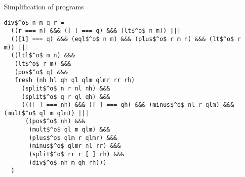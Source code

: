 \documentclass{beamer}
\let\\\tabularnewline
\let\\\tabularnewline
\theoremstyle{definition}
\theoremstyle{plain} %
\begin{document}
\begin{frame}[fragile]{Simplification of programs}



\newsavebox{\mybox}

\begin{lrbox}{\mybox}
    \begin{lstlisting}[basicstyle=\tiny]
div$^o$ n m q r =
  ((r === n) &&& ([ ] === q) &&& (lt$^o$ n m)) |||
  (([1] === q) &&& (eql$^o$ n m) &&& (plus$^o$ r m n) &&& (lt$^o$ r m)) |||
  ((ltl$^o$ m n) &&&
   (lt$^o$ r m) &&&
   (pos$^o$ q) &&&
   fresh (nh hl qh ql qlm qlmr rr rh)
     (split$^o$ n r nl nh) &&&
     (split$^o$ q r ql qh) &&&
     ((([ ] === nh) &&& ([ ] === qh) &&& (minus$^o$ nl r qlm) &&& (mult$^o$ ql m qlm)) |||
      ((pos$^o$ nh) &&&
       (mult$^o$ ql m qlm) &&&
       (plus$^o$ qlm r qlmr) &&&
       (minus$^o$ qlmr nl rr) &&&
       (split$^o$ rr r [ ] rh) &&&
       (div$^o$ nh m qh rh)))
  )
    \end{lstlisting}
\end{lrbox}

\scalebox{1}{\usebox{\mybox}}


\begin{comment}
&

\begin{minipage}{.5\textwidth}
\begin{lstlisting}[escapeinside={(@}{@)},mathescape=true,language=ocaml]
div$^o$ n m q r =
  fresh (mq)
    (mult$^o$ m q mq) &&&
    (plus$^o$ mq r n) &&&
    (lt$^o$ r m)
\end{lstlisting}
\end{minipage}
\end{comment}

\end{frame}
\end{document}

